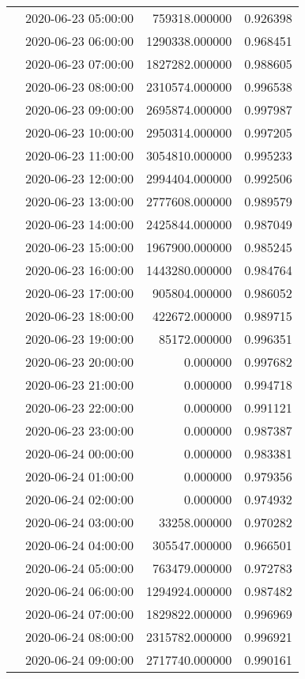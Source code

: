 \begin{tabular}{llrr}
 & 2020-06-23 05:00:00 & 759318.000000 & 0.926398 \\
 & 2020-06-23 06:00:00 & 1290338.000000 & 0.968451 \\
 & 2020-06-23 07:00:00 & 1827282.000000 & 0.988605 \\
 & 2020-06-23 08:00:00 & 2310574.000000 & 0.996538 \\
 & 2020-06-23 09:00:00 & 2695874.000000 & 0.997987 \\
 & 2020-06-23 10:00:00 & 2950314.000000 & 0.997205 \\
 & 2020-06-23 11:00:00 & 3054810.000000 & 0.995233 \\
 & 2020-06-23 12:00:00 & 2994404.000000 & 0.992506 \\
 & 2020-06-23 13:00:00 & 2777608.000000 & 0.989579 \\
 & 2020-06-23 14:00:00 & 2425844.000000 & 0.987049 \\
 & 2020-06-23 15:00:00 & 1967900.000000 & 0.985245 \\
 & 2020-06-23 16:00:00 & 1443280.000000 & 0.984764 \\
 & 2020-06-23 17:00:00 & 905804.000000 & 0.986052 \\
 & 2020-06-23 18:00:00 & 422672.000000 & 0.989715 \\
 & 2020-06-23 19:00:00 & 85172.000000 & 0.996351 \\
 & 2020-06-23 20:00:00 & 0.000000 & 0.997682 \\
 & 2020-06-23 21:00:00 & 0.000000 & 0.994718 \\
 & 2020-06-23 22:00:00 & 0.000000 & 0.991121 \\
 & 2020-06-23 23:00:00 & 0.000000 & 0.987387 \\
 & 2020-06-24 00:00:00 & 0.000000 & 0.983381 \\
 & 2020-06-24 01:00:00 & 0.000000 & 0.979356 \\
 & 2020-06-24 02:00:00 & 0.000000 & 0.974932 \\
 & 2020-06-24 03:00:00 & 33258.000000 & 0.970282 \\
 & 2020-06-24 04:00:00 & 305547.000000 & 0.966501 \\
 & 2020-06-24 05:00:00 & 763479.000000 & 0.972783 \\
 & 2020-06-24 06:00:00 & 1294924.000000 & 0.987482 \\
 & 2020-06-24 07:00:00 & 1829822.000000 & 0.996969 \\
 & 2020-06-24 08:00:00 & 2315782.000000 & 0.996921 \\
 & 2020-06-24 09:00:00 & 2717740.000000 & 0.990161 \\

\end{tabular}
